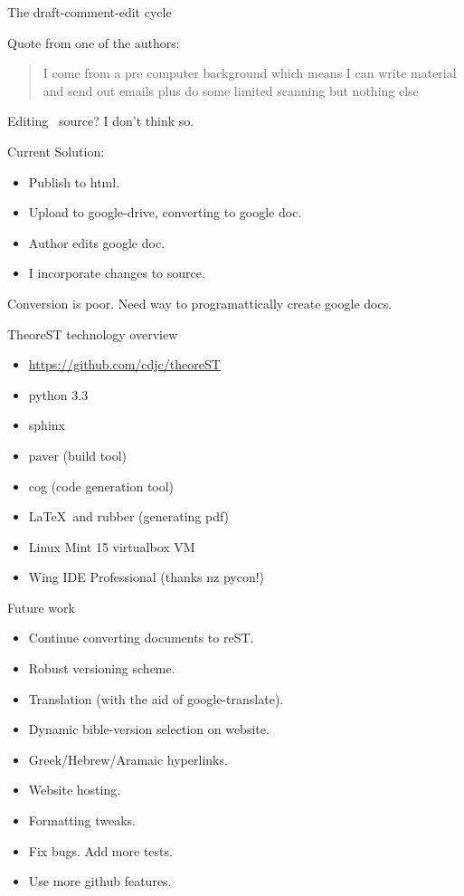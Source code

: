 \documentclass{beamer}
\begin{document}
\begin{frame}[fragile]{The draft-comment-edit cycle}

Quote from one of the authors:

\begin{quote}
I come from a pre computer background which means I can write material and
send out emails plus do some limited scanning but nothing else
\end{quote}

Editing \rst\ source? I don't think so.

Current Solution:

\begin{itemize}
\item Publish to html.
\item Upload to google-drive, converting to google doc.
\item Author edits google doc.
\item I incorporate changes to \rst source.
\end{itemize}
Conversion is poor. Need way to programattically create google docs.
\end{frame}

\begin{frame}[fragile]{TheoreST technology overview}
\begin{itemize}
\item \url{https://github.com/cdjc/theoreST}
\item python 3.3
\item sphinx
\item paver (build tool)
\item cog (code generation tool)
\item \LaTeX\  and rubber (generating pdf)
\item Linux Mint 15 virtualbox VM
\item Wing IDE Professional (thanks nz pycon!)
\end{itemize}
\end{frame}

\begin{frame}{Future work}
\begin{itemize}
\item Continue converting documents to reST.
\item Robust versioning scheme.
\item Translation (with the aid of google-translate).
\item Dynamic bible-version selection on website.
\item Greek/Hebrew/Aramaic hyperlinks.
\item Website hosting.
\item Formatting tweaks.
\item Fix bugs. Add more tests.
\item Use more github features.
\end{itemize}

\end{frame}
\end{document}
